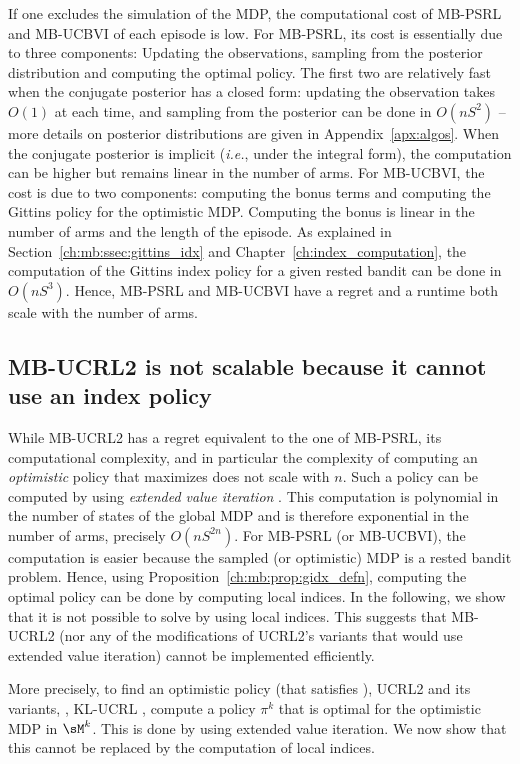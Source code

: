 If one excludes the simulation of the MDP, the computational cost of MB-PSRL and MB-UCBVI of each episode is low. For MB-PSRL, its cost is essentially due to three components: Updating the observations, sampling from the posterior distribution and computing the optimal policy. The first two are relatively fast when the conjugate posterior has a closed form: updating the observation takes $O(1)$ at each time, and sampling from the posterior can be done in $O(nS^2)$ -- more details on posterior distributions are given in Appendix~\ref{apx:algos}. When the conjugate posterior is implicit (\emph{i.e.}, under the integral form), the computation can be higher but remains linear in the number of arms. For MB-UCBVI, the cost is due to two components: computing the bonus terms and computing the Gittins policy for the optimistic MDP. Computing the bonus is linear in the number of arms and the length of the episode. As explained in Section~\ref{ch:mb:ssec:gittins_idx} and Chapter~\ref{ch:index_computation}, the computation of the Gittins index policy for a given rested bandit can be done in $O(nS^3)$. Hence, MB-PSRL and MB-UCBVI have a regret and a runtime both scale with the number of arms.

\subsection{MB-UCRL2 is not scalable because it cannot use an index policy}
\label{ssec:no-OFU}

While MB-UCRL2 has a regret equivalent to the one of MB-PSRL, its computational complexity, and in particular the complexity of computing an \emph{optimistic} policy that maximizes  does not scale with $n$. Such a policy can be computed by using \emph{extended value iteration} \cite{jaksch2010near}. This computation is polynomial in the number of states of the global MDP and is therefore exponential in the number of arms, precisely $O(nS^{2n})$.
For MB-PSRL (or MB-UCBVI), the computation is easier because the sampled (or optimistic) MDP is a rested bandit problem. Hence, using Proposition~\ref{ch:mb:prop:gidx_defn}, computing the optimal policy can be done by computing local indices. In the following, we show that it is not possible to solve  by using local indices. This suggests that MB-UCRL2 (nor any of the modifications of UCRL2's variants that would use extended value iteration) cannot be implemented efficiently.

More precisely, to find an optimistic policy (that satisfies ), UCRL2 and its variants, \eg, KL-UCRL \cite{filippi2010optimism}, compute a policy $\pi^k$ that is optimal for the optimistic MDP in $\sM^k$. This is done by using extended value iteration. We now show that this cannot be replaced by the computation of local indices.

